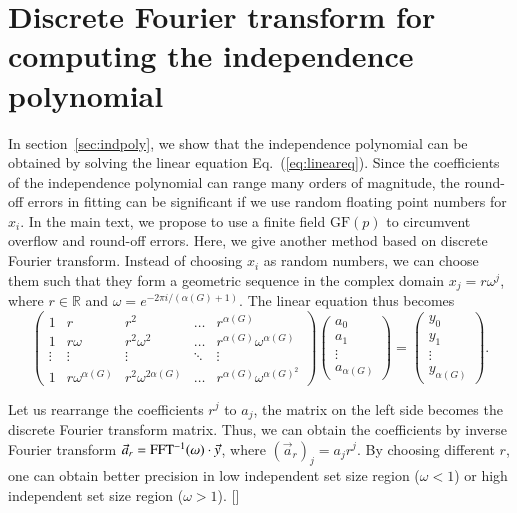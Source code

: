 \documentclass[onefignum, onetabnum]{siamart190516}
\newcommand{\<}{\langle}
\renewcommand{\>}{\rangle}
\newcommand{\Eq}[1]{Eq.~(\ref{#1})}
\newcommand{\red}[1]{[{\bf  \color{red}{ST: #1}}]}
\begin{document}
\section{Discrete Fourier transform for computing the independence polynomial}\label{app:fft}

In section~\ref{sec:indpoly}, we show that the independence polynomial can be obtained by solving the linear equation \Eq{eq:lineareq}. Since the coefficients of the independence polynomial can range many orders of magnitude, the round-off errors in fitting can be significant if we use random floating point numbers for $x_{i}$. In the main text, we propose to use a finite field $\text{GF}(p)$ to circumvent overflow and round-off errors. Here, we give another method based on discrete Fourier transform. Instead of choosing $x_{i}$ as random numbers, we can choose them such that they form a geometric sequence in the complex domain $x_j = r\omega^j$, where $r \in \mathbb{R}$ and $\omega = e^{-2\pi i/( \alpha(G)+1)}$. The linear equation thus becomes
\begin{equation}
\left(\begin{matrix}
1 & r & r^2 & \ldots & r^{\alpha(G)} \\
1 & r\omega & r^2\omega^2 & \ldots & r^{\alpha(G)} \omega^{\alpha(G)} \\
\vdots & \vdots & \vdots &\ddots & \vdots \\
1 & r\omega^{\alpha(G)} & r^2\omega^{2{\alpha(G)}} & \ldots & r^{\alpha(G)}\omega^{{\alpha(G)}^2}
\end{matrix}\right)
\left(\begin{matrix}
a_0 \\ a_1 \\ \vdots \\ a_{\alpha(G)}
\end{matrix}\right)
= \left(\begin{matrix}
y_0 \\ y_1 \\ \vdots \\ y_{\alpha(G)}
\end{matrix}\right).
\end{equation}

Let us rearrange the coefficients $r^j$ to $a_j$, the matrix on the left side becomes the discrete Fourier transform matrix. Thus, we can obtain the coefficients by inverse Fourier transform $\vec a_r = {\rm FFT^{-1}}(\omega) \cdot \vec y$, where $(\vec a_r)_j = a_j r ^j$.
By choosing different $r$, one can obtain better precision in low independent set size region  ($\omega<1$) or high independent set size region ($\omega>1$). \red{is that $\omega < 1$ or $r <1$?}
\end{document}
